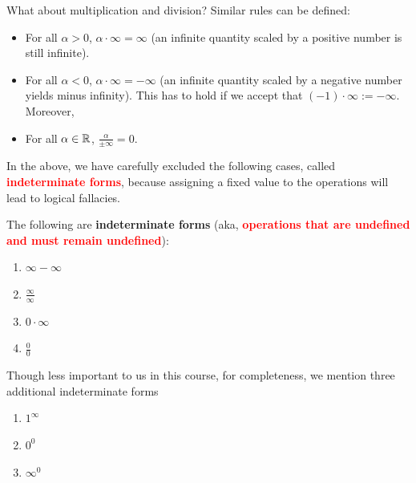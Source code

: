 What about multiplication and division? Similar rules can be defined:
\begin{itemize}
    \item For all $\alpha >0$, $\alpha \cdot \infty = \infty$ (an infinite quantity scaled by a positive number is still infinite). 
     \item For all $\alpha <0$, $\alpha \cdot \infty = -\infty$ (an infinite quantity scaled by a negative number yields minus infinity). This has to hold if we accept that $(-1) \cdot \infty:= -\infty$. Moreover,
     \item For all $\alpha \in \mathbb R$, $\frac{\alpha}{\pm \infty} = 0$.    
\end{itemize}

In the above, we have carefully excluded the following cases, called \textcolor{red}{\bf indeterminate forms}, because assigning a fixed value to the operations will lead to logical fallacies. 

\begin{tcolorbox}[colback=mylightblue, title = {\bf Indeterminate Forms}, breakable]


\begin{definition} The following are \textbf{indeterminate forms} (aka, \textcolor{red}{\bf operations that are undefined and must remain undefined}):

\begin{enumerate}
\renewcommand{\labelenumi}{(\alph{enumi})}
\setlength{\itemsep}{.2cm}
\item $\infty - \infty$
\item $\frac{\infty}{\infty}$
\item $0 \cdot \infty$
\item $\frac{0}{0}$
\end{enumerate}

Though less important to us in this course, for completeness, we mention three additional indeterminate forms

\begin{enumerate}
\renewcommand{\labelenumi}{(\alph{enumi})}
\setcounter{enumi}{4}  %
\item $1^\infty$
\item $0^0$
\item $\infty^0$
\end{enumerate}
\end{definition}


\end{tcolorbox}
\bigskip

